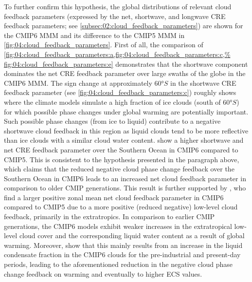 To further confirm this hypothesis, the global distributions of relevant cloud
feedback parameters (expressed by the net, shortwave, and longwave \ac{CRE}
feedback parameters; see \cref{subsec:02:cloud_feedback_parameters}) are shown
for the \acs{CMIP}6 \ac{MMM} and its difference to the \acs{CMIP}5 \ac{MMM} in
\cref{fig:04:cloud_feedback_parameters}. First of all, the comparison of
\cref{fig:04:cloud_feedback_parameters:a,fig:04:cloud_feedback_parameters:c,%
  fig:04:cloud_feedback_parameters:e} demonstrates that the shortwave component
dominates the net \ac{CRE} feedback parameter over large swaths of the globe
in the \acs{CMIP}6 \ac{MMM}. The sign change at approximately $60
\unit{\degree S}$ in the shortwave \ac{CRE} feedback parameter (see
\cref{fig:04:cloud_feedback_parameters:c}) roughly shows where the climate
models simulate a high fraction of ice clouds (south of $60 \unit{\degree
  S}$) for which possible phase changes under global warming are potentially
important. Such possible phase changes (from ice to liquid) contribute to a
negative shortwave cloud feedback in this region as liquid clouds tend to be
more reflective than ice clouds with a similar cloud water content.
show a higher shortwave and net \ac{CRE} feedback parameter over the Southern
Ocean in \acs{CMIP}6 compared to \acs{CMIP}5. This is consistent to the
hypothesis presented in the paragraph above, which claims that the reduced
negative cloud phase change feedback over the Southern Ocean in \acs{CMIP}6
leads to an increased net cloud feedback parameter in comparison to older
\ac{CMIP} generations. This result is further supported by
\textcite{Zelinka2020}, who find a larger positive zonal mean net cloud
feedback parameter in \acs{CMIP}6 compared to \acs{CMIP}5 due to a more
positive (reduced negative) low-level cloud feedback, primarily in the
extratropics. In comparison to earlier \acs{CMIP} generations, the
\acs{CMIP}6 models exhibit weaker increases in the extratropical low-level
cloud cover and the corresponding liquid water content as a result of global
warming. Moreover, \textcite{Zelinka2020} show that this mainly results from
an increase in the liquid condensate fraction in the \acs{CMIP}6 clouds for
the pre-industrial and present-day periods, leading to the aforementioned
reduction in the negative cloud phase change feedback on warming and
eventually to higher \ac{ECS} values.
